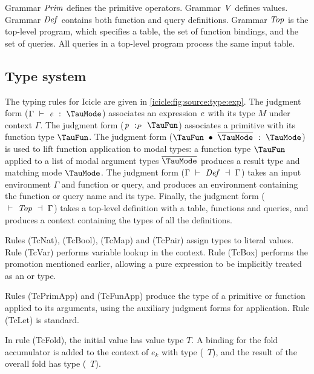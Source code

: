 Grammar $\mathit{Prim}$ defines the primitive operators.
Grammar $\mathit{V}$ defines values.
Grammar $\mathit{Def}$ contains both function and query definitions.
Grammar $\mathit{Top}$ is the top-level program, which specifies a table, the set of function bindings, and the set of queries.
All queries in a top-level program process the same input table.


\subsection{Type system}
\label{icicle:s:ElementsAndAggregates:TypeSystem}

The typing rules for Icicle are given in \cref{icicle:fig:source:type:exp}.
The judgment form ($\Typecheck{\Gamma}{\mi{e}}{\TauMode}$) associates an expression $\mathit{e}$ with its type $M$ under context $\Gamma$.
The judgment form ($\TypecheckP{\mi{p}}{\TauFun}$) associates a primitive with its function type $\TauFun$.
The judgment form ($\TypecheckApp{\TauFun}{\ov{\TauMode}}{\TauMode}$) is used to lift function application to modal types: a function type $\TauFun$ applied to a list of modal argument types $\ov{\TauMode}$ produces a result type and matching mode $\TauMode$.
The judgment form ($\TypecheckS{\Gamma}{\mi{Def}}{\Gamma}$) takes an input environment $\Gamma$ and function or query, and produces an environment containing the function or query name and its type.
Finally, the judgment form ($\TypecheckS{}{\mi{Top}}{\Gamma}$) takes a top-level definition with a table, functions and queries, and produces a context containing the types of all the definitions.




Rules (TcNat), (TcBool), (TcMap) and (TcPair) assign types to literal values.
Rule (TcVar) performs variable lookup in the context.
Rule (TcBox) performs the promotion mentioned earlier, allowing a pure expression to be implicitly treated as an \Ic@Element@ or \Ic@Aggregate@ type. 

Rules (TcPrimApp) and (TcFunApp) produce the type of a primitive or function applied to its arguments, using the auxiliary judgment forms for application.
Rule (TcLet) is standard.

In rule (TcFold), the initial value has value type $T$.
A binding for the fold accumulator is added to the context of $e_k$ with type (\Ic@Element@~$T$), and the result of the overall fold has type (\Ic@Aggregate@~$T$).

